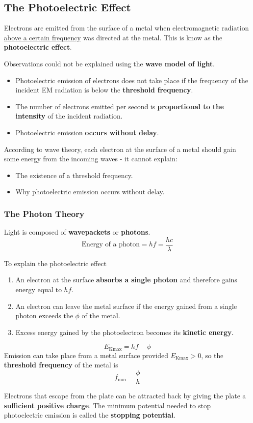 \subsection{The Photoelectric Effect}

Electrons are emitted from the surface of a metal when electromagnetic radiation \underline{above a certain frequency} was directed at the metal. This is know as the \textbf{photoelectric effect}.

Observations could not be explained using the \textbf{wave model of light}.
\begin{itemize}
    \item Photoelectric emission of electrons does not take place if the frequency of the incident EM radiation is below the \textbf{threshold frequency}.
    \item The number of electrons emitted per second is \textbf{proportional to the intensity} of the incident radiation.
    \item Photoelectric emission \textbf{occurs without delay}.
\end{itemize}
According to wave theory, each electron at the surface of a metal should gain some energy from the incoming waves - it cannot explain:
\begin{itemize}
    \item The existence of a threshold frequency.
    \item Why photoelectric emission occurs without delay.
\end{itemize}

\subsubsection*{The Photon Theory}

Light is composed of \textbf{wavepackets} or \textbf{photons}.
$$\text{Energy of a photon}=hf=\frac{hc}{\lambda}$$

To explain the photoelectric effect
\begin{enumerate}
    \item An electron at the surface \textbf{absorbs a single photon} and therefore gains energy equal to $hf$.
    \item An electron can leave the metal surface if the energy gained from a single photon exceeds the  $\phi$ of the metal.
    \item Excess energy gained by the photoelectron becomes its \textbf{kinetic energy}.
\end{enumerate}
$$E_\text{Kmax}=hf-\phi$$
Emission can take place from a metal surface provided $E_\text{Kmax}>0$, so the \textbf{threshold frequency} of the metal is
$$f_\text{min}=\frac{\phi}{h}$$

Electrons that escape from the plate can be attracted back by giving the plate a \textbf{sufficient positive charge}. The minimum potential needed to stop photoelectric emission is called the \textbf{stopping potential}.
